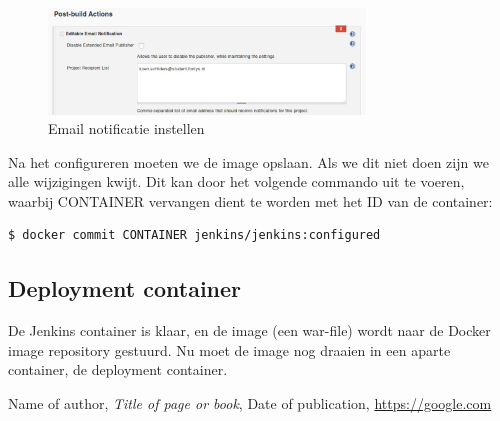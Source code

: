 \documentclass[12pt]{article}
\begin{document}
\begin{figure}[H]
	\begin{center}
		\includegraphics[width=0.75\textwidth]{images/Postbuildaction.png}
		\caption{Email notificatie instellen\label{fig:calculator_app}}
	\end{center}
\end{figure}

Na het configureren moeten we de image opslaan. Als we dit niet doen zijn we alle wijzigingen kwijt. Dit kan door het volgende commando uit te voeren, waarbij CONTAINER vervangen dient te worden met het ID van de container:

\begin{lstlisting}[language=Bash]
    $ docker commit CONTAINER jenkins/jenkins:configured
\end{lstlisting}



\subsection{Deployment container}
De Jenkins container is klaar, en de image (een war-file) wordt naar de Docker image repository gestuurd. Nu moet de image nog draaien in een aparte container, de deployment container.






\begin{thebibliography}{9}
		Name of author,
		\textit{Title of page or book},
		Date of publication,
		\url{https://google.com}
\end{thebibliography}
\end{document}

